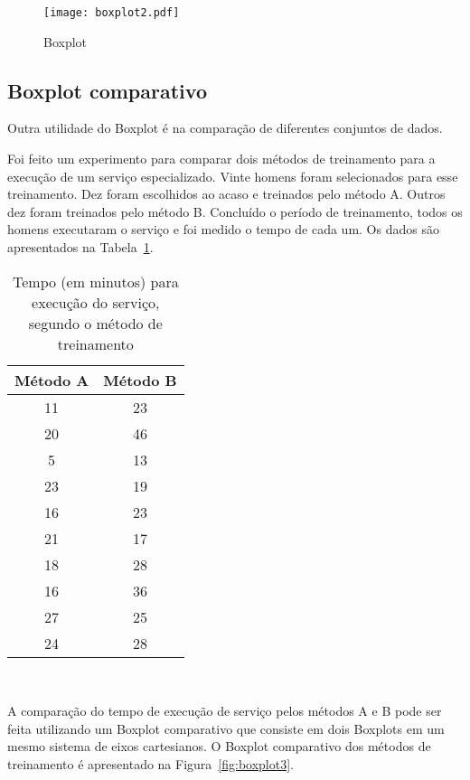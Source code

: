 \documentclass[11pt,fleqn]{book} %
\begin{document}
\begin{figure}[h!]
\centering\texttt{[image: boxplot2.pdf]}
\setlength{\abovecaptionskip}{0.5pt}
\caption{Boxplot}
\label{fig:boxplot2} %
\end{figure}


\subsection{Boxplot comparativo}

Outra utilidade do Boxplot é na comparação de diferentes conjuntos de dados. \\

\begin{example}\label{exemp:boxplotcomp}

Foi feito um experimento para comparar dois métodos de treinamento para a execução de um serviço especializado. Vinte homens foram selecionados para esse treinamento. Dez foram escolhidos ao acaso e treinados pelo método A. Outros dez foram treinados pelo método B. Concluído o período de treinamento, todos os homens executaram o serviço e foi medido o tempo de cada um. Os dados são apresentados na Tabela~\ref{tab:boxplotcomp}.

\begin{table}[h]
	\caption{Tempo (em minutos) para execução do serviço, segundo o método de treinamento}
	\label{tab:boxplotcomp} 
	\vspace{-0.1cm}
	\centering
	\begin{tabular}{c c}
	\toprule
	\textbf{Método A} & \textbf{Método B} \\
	\midrule
	11 & 23 \\
	20 & 46 \\
	5 & 13 \\
	23 & 19 \\
	16 & 23 \\
	21 & 17 \\
	18 & 28 \\
	16 & 36 \\
	27 & 25 \\
	24 & 28 \\
	\bottomrule
	\end{tabular} \\
\end{table}

A comparação do tempo de execução de serviço pelos métodos A e B pode ser feita utilizando um Boxplot comparativo que consiste em dois Boxplots em um mesmo sistema de eixos cartesianos. O Boxplot comparativo dos métodos de treinamento é apresentado na Figura~\ref{fig:boxplot3}.



\end{example}
\end{document}
